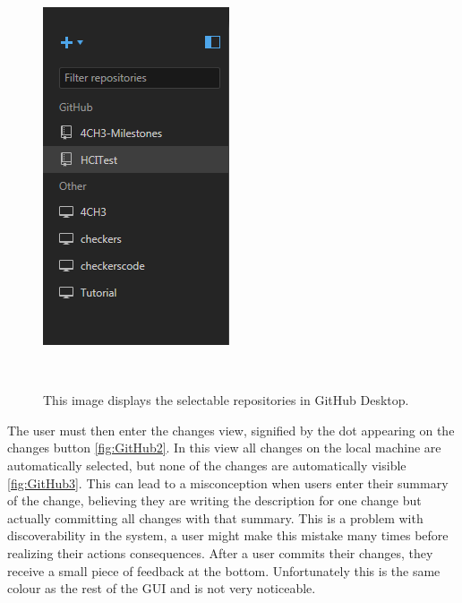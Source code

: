 \documentclass{sigchi}
\begin{document}
\begin{figure}
  \centering
  \includegraphics[width=1.75\columnwidth]{figures/GitHub/Git-Hub-Repositories.PNG}
  \caption{This image displays the selectable repositories in GitHub Desktop.}~\label{fig:GitHub1}
\end{figure}

The user must then enter the changes view, signified by the dot appearing on the changes 
button \ref{fig:GitHub2}. In this view all changes on the local machine are automatically selected, but none of the 
changes are automatically visible \ref{fig:GitHub3}. This can lead to a misconception when users enter their summary
of the change, believing they are writing the description for one change but actually committing 
all changes with that summary. This is a problem with discoverability in the system, a user might 
make this mistake many times before realizing their actions consequences. After a user commits their 
changes, they receive a small piece of feedback at the bottom. Unfortunately this is the same colour 
as the rest of the GUI and is not very noticeable.
\end{document}
